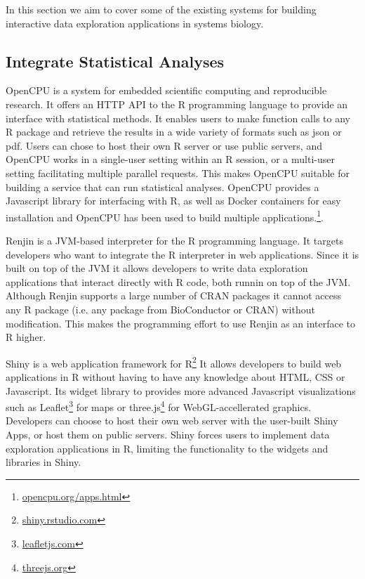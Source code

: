 In this section we aim to cover some of the existing systems for building
interactive data exploration applications in systems biology. 

\subsection*{Integrate Statistical Analyses} 
OpenCPU is a system for embedded scientific computing and reproducible
research.\cite{opencpu} It offers an HTTP API to the R programming language to
provide an interface with statistical methods. It enables users to make function
calls to any R package and retrieve the results in a wide variety of formats
such as json or pdf. 
Users can chose to host their own R server or use public servers, and OpenCPU
works in a single-user setting within an R session, or a multi-user setting
facilitating multiple parallel requests. This makes OpenCPU suitable
for building a service that can run statistical analyses. 
OpenCPU provides a Javascript library for interfacing with R, as well as Docker
containers for easy installation and OpenCPU has been used to build multiple
applications.\footnote{\url{opencpu.org/apps.html}}.

Renjin is a JVM-based interpreter for the R programming language.\cite{renjin}
It targets developers who want to integrate the R interpreter in web
applications. Since it is built on top of the JVM it allows developers to write
data exploration applications that interact directly with R code, both runnin on
top of the JVM. Although Renjin supports a large number of CRAN packages it
cannot access any R package (i.e.  any package from BioConductor or CRAN)
without modification. This makes the programming effort to use Renjin as an
interface to R higher. 

Shiny is a web application framework for R\footnote{\url{shiny.rstudio.com}}
It allows developers to
build web applications in R without having to have any knowledge about HTML, CSS
or Javascript. Its widget library to provides more advanced Javascript
visualizations such as Leaflet\footnote{\url{leafletjs.com}} for maps or
three.js\footnote{\url{threejs.org}} for WebGL-accellerated
graphics. Developers can choose to host their own web server with the user-built
Shiny Apps, or host them on public servers. Shiny forces users to implement data
exploration applications in R, limiting the functionality to the 
widgets and libraries in Shiny. 


